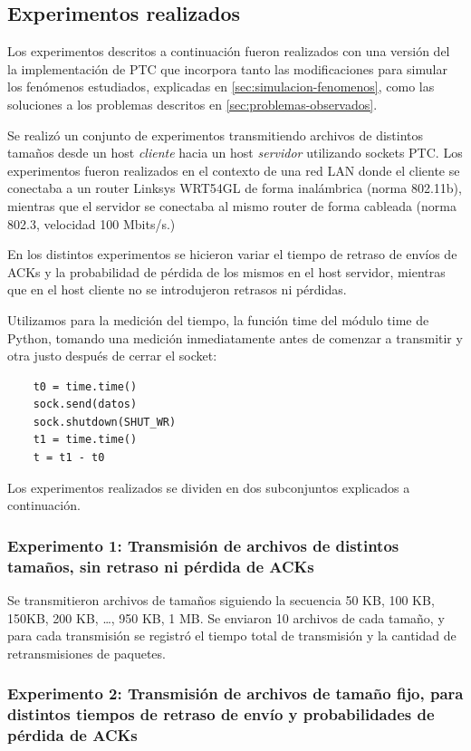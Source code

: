 \documentclass[a4paper, 10pt, twoside]{article}
\begin{document}
\subsection{Experimentos realizados}
\label{sec:experimentos}

Los experimentos descritos a continuación fueron realizados con una versión del la implementación de PTC que incorpora tanto las modificaciones para simular los fenómenos estudiados, explicadas en \ref{sec:simulacion-fenomenos}, como las soluciones a los problemas descritos en \ref{sec:problemas-observados}.

Se realizó un conjunto de experimentos transmitiendo archivos de distintos tamaños desde un host \emph{cliente} hacia un host \emph{servidor} utilizando sockets PTC. Los experimentos fueron realizados en el contexto de una red LAN donde el cliente se conectaba a un router Linksys WRT54GL de forma inalámbrica (norma 802.11b), mientras que el servidor se conectaba al mismo router de forma cableada (norma 802.3, velocidad 100 Mbits/s.)

En los distintos experimentos se hicieron variar el tiempo de retraso de envíos de ACKs y la probabilidad de pérdida de los mismos en el host servidor, mientras que en el host cliente no se introdujeron retrasos ni pérdidas.

Utilizamos para la medición del tiempo, la función time del módulo time de Python, tomando una medición inmediatamente antes de comenzar a transmitir y otra justo después de cerrar el socket:
\begin{verbatim}
    t0 = time.time()
    sock.send(datos)
    sock.shutdown(SHUT_WR)
    t1 = time.time()
    t = t1 - t0
\end{verbatim}

Los experimentos realizados se dividen en dos subconjuntos explicados a continuación.


\subsubsection{Experimento 1: Transmisión de archivos de distintos tamaños, sin retraso ni pérdida de ACKs}

Se transmitieron archivos de tamaños siguiendo la secuencia 50 KB, 100 KB, 150KB, 200 KB, \ldots, 950 KB, 1 MB. Se enviaron 10 archivos de cada tamaño, y para cada transmisión se registró el tiempo total de transmisión y la cantidad de retransmisiones de paquetes.


\subsubsection{Experimento 2: Transmisión de archivos de tamaño fijo, para distintos tiempos de retraso de envío y probabilidades de pérdida de ACKs}
\end{document}
